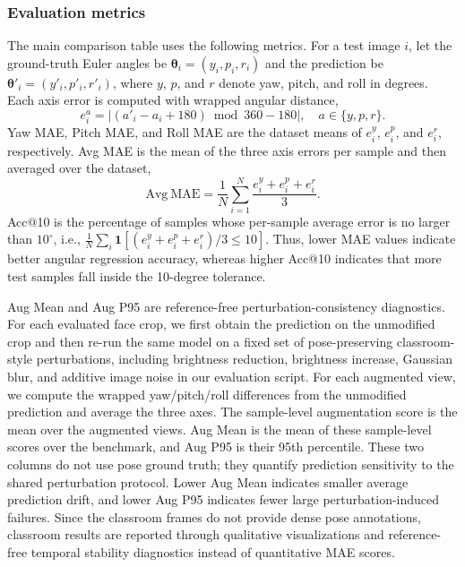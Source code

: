 \documentclass[preprint,12pt]{elsarticle}
\begin{document}
\subsubsection{Evaluation metrics}
The main comparison table uses the following metrics. For a test image $i$, let the ground-truth Euler angles be $\boldsymbol{\theta}_i=(y_i,p_i,r_i)$ and the prediction be $\boldsymbol{\theta}'_i=(y'_i,p'_i,r'_i)$, where $y$, $p$, and $r$ denote yaw, pitch, and roll in degrees. Each axis error is computed with wrapped angular distance,
\begin{equation}
 e_i^a = \left| (a'_i-a_i+180) \bmod 360 - 180 \right|,
 \quad a \in \{y,p,r\}.
\end{equation}
Yaw MAE, Pitch MAE, and Roll MAE are the dataset means of $e_i^y$, $e_i^p$, and $e_i^r$, respectively. Avg MAE is the mean of the three axis errors per sample and then averaged over the dataset,
\begin{equation}
 \mathrm{Avg\ MAE}=\frac{1}{N}\sum_{i=1}^{N}\frac{e_i^y+e_i^p+e_i^r}{3}.
\end{equation}
Acc@10 is the percentage of samples whose per-sample average error is no larger than $10^\circ$, i.e., $\frac{1}{N}\sum_i \mathbf{1}[(e_i^y+e_i^p+e_i^r)/3\leq 10]$. Thus, lower MAE values indicate better angular regression accuracy, whereas higher Acc@10 indicates that more test samples fall inside the 10-degree tolerance.

Aug Mean and Aug P95 are reference-free perturbation-consistency diagnostics. For each evaluated face crop, we first obtain the prediction on the unmodified crop and then re-run the same model on a fixed set of pose-preserving classroom-style perturbations, including brightness reduction, brightness increase, Gaussian blur, and additive image noise in our evaluation script. For each augmented view, we compute the wrapped yaw/pitch/roll differences from the unmodified prediction and average the three axes. The sample-level augmentation score is the mean over the augmented views. Aug Mean is the mean of these sample-level scores over the benchmark, and Aug P95 is their 95th percentile. These two columns do not use pose ground truth; they quantify prediction sensitivity to the shared perturbation protocol. Lower Aug Mean indicates smaller average prediction drift, and lower Aug P95 indicates fewer large perturbation-induced failures. Since the classroom frames do not provide dense pose annotations, classroom results are reported through qualitative visualizations and reference-free temporal stability diagnostics instead of quantitative MAE scores.
\end{document}

